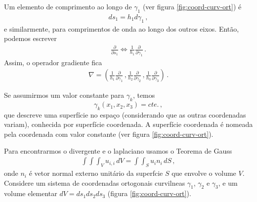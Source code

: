 Um elemento de comprimento ao longo de $\gamma_{1}$ (ver figura \ref{fig:coord-curv-ort}) \'e
\begin{eqnarray}
ds_{1} = h_{1}d\gamma_{1}\, ,
\end{eqnarray}
e similarmente, para comprimentos de onda ao longo dos outros eixos. Ent\~ao, podemos escrever
\begin{eqnarray}
\frac{\partial}{\partial s_{1}} \Leftrightarrow
\frac{1}{h_{1}}\frac{\partial}{\partial\gamma_{1}}\, .
\end{eqnarray}
Assim, o operador gradiente fica
\begin{eqnarray}
\nabla = \left(
\frac{1}{h_{1}}\frac{\partial}{\partial\gamma_{1}}\, ,
  \frac{1}{h_{2}}\frac{\partial}{\partial\gamma_{2}}\, ,
\frac{1}{h_{3}}\frac{\partial}{\partial\gamma_{3}}\right)\, .
\end{eqnarray}

Se assumirmos um valor constante para $\gamma_{k}$, temos
\begin{equation}
\gamma_{k}(x_1,x_2,x_3)=cte.\, ,    %
\end{equation}
que descreve uma superf\'icie no espa\c{c}o (considerando que as outras coordenadas variam),
conhecida por superf\'icie coordenada.
A superf\'icie coordenada \'e nomeada pela coordenada com valor constante 
(ver figura \ref{fig:coord-curv-ort}).

Para encontrarmos o divergente e o laplaciano usamos o Teorema de Gauss
\begin{eqnarray}
\int\!\!\!\int\!\!\!\int_{V} u_{i,i}\,dV = \int\!\!\!\int_{S} u_{i}n_{i}\,dS  \, ,
\end{eqnarray}
onde $n_{i}$ \'e vetor normal externo unit\'ario da superf\ih cie $S$ que envolve o volume $V$. 
Considere um sistema de coordenadas ortogonais curvil\ih neas $\gamma_{1}$, $\gamma_{2}$ e 
$\gamma_{3}$, 
e um volume elementar $dV = ds_{1}ds_{2}ds_{3}$ (figura \ref{fig:coord-curv-ort}).

